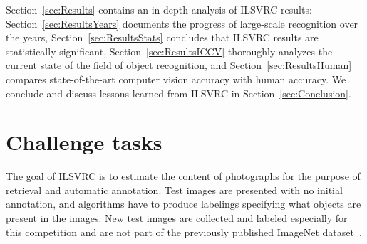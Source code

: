Section~\ref{sec:Results} contains an in-depth  analysis of ILSVRC results:
 Section~\ref{sec:ResultsYears} documents the progress of large-scale recognition over the years, Section~\ref{sec:ResultsStats} concludes that ILSVRC results are statistically significant,
Section~\ref{sec:ResultsICCV}  thoroughly analyzes the current state of the field of object recognition, and Section~\ref{sec:ResultsHuman} compares state-of-the-art computer vision accuracy with human accuracy. We conclude and
discuss lessons learned from ILSVRC in Section~\ref{sec:Conclusion}.



\section{Challenge tasks}
\label{sec:Tasks}

The goal of ILSVRC is to estimate the content of photographs for the purpose of retrieval and automatic annotation.
Test images are presented with no initial annotation, and algorithms  have to produce labelings specifying what objects are present in the images. New test images are collected and labeled especially for this competition and are not part of the previously published ImageNet dataset~\citep{ImageNet}. 


